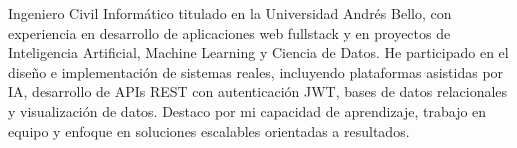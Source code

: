 

\begin{cvparagraph}

Ingeniero Civil Informático titulado en la Universidad Andrés Bello, con experiencia en desarrollo de aplicaciones web fullstack y en proyectos de Inteligencia Artificial, Machine Learning y Ciencia de Datos. He participado en el diseño e implementación de sistemas reales, incluyendo plataformas asistidas por IA, desarrollo de APIs REST con autenticación JWT, bases de datos relacionales y visualización de datos. Destaco por mi capacidad de aprendizaje, trabajo en equipo y enfoque en soluciones escalables orientadas a resultados.
\end{cvparagraph}
